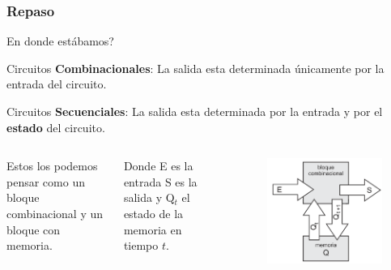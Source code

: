 \documentclass[10pt]{beamer}
\begin{document}
\begin{frame}
\frametitle{Repaso}
En donde estábamos?

\pause
Circuitos \textbf{Combinacionales}: La salida  esta determinada únicamente por la entrada
del circuito.

\pause
Circuitos \textbf{Secuenciales}: La salida esta determinada por la entrada y por el \textbf{estado}
del circuito.
\begin{columns}
    \pause

Estos los podemos pensar como un bloque combinacional y un bloque con memoria.

Donde E es la entrada S es la salida y  Q$_t$ el estado de la memoria en tiempo $t$.
        \begin{figure}[h!]
    \centering
    \includegraphics[scale=0.2]{secuencial.png}
\end{figure}
\end{columns}

\end{frame}
\end{document}
